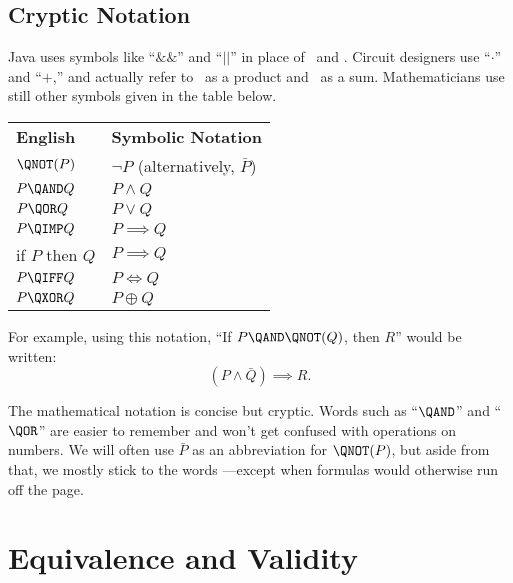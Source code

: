 \subsection{Cryptic Notation}
Java uses symbols like ``$\&\&$'' and ``$||$'' in place of \QAND\ and
\QOR.  Circuit designers use ``$\cdot$'' and ``$+$,'' and actually refer
to \QAND\ as a product and \QOR\ as a sum.  Mathematicians use still
other symbols given in the table below.
%
\begin{center}
\begin{tabular}{ll}
\textbf{English} & \textbf{Symbolic Notation} \\[1ex]
$\QNOT(P)$ & $\neg P$ \quad (alternatively, $\bar{P}$) \\
$P \QAND Q$ & $P \land Q$ \\
$P \QOR Q$ & $P \lor Q$ \\
$P \QIMP Q$ & $P \implies Q$ \\
if $P$ then $Q$ & $P \implies Q$ \\
$P \QIFF Q$ & $P \iff Q$\\
$P \QXOR Q$ & $P \oplus Q$
\end{tabular}
\end{center}
%
For example, using this notation, ``If $P \QAND \QNOT(Q)$, then $R$''
would be written:
%
\[
    (P \land \bar{Q}) \implies R.
\]

The mathematical notation is concise but cryptic.  Words such as
``$\QAND$'' and ``$\QOR$'' are easier to remember and won't get
confused with operations on numbers.  We will often use $\bar{P}$ as
an abbreviation for $\QNOT(P)$, but aside from that, we mostly stick
to the words ---except when formulas would otherwise run off the page.

\begin{problems}
\classproblems
{}

\homeworkproblems
{}

\examproblems
{}
\end{problems}

\section{Equivalence and Validity}\label{equiv_valid_sec}

